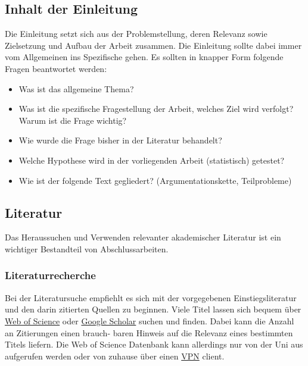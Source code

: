 \documentclass[a4paper,12pt]{article}
\providecommand{\tightlist}{%
  \setlength{\itemsep}{0pt}\setlength{\parskip}{0pt}}
\begin{document}
\hypertarget{inhalt-der-einleitung}{%
\subsection{Inhalt der Einleitung}\label{inhalt-der-einleitung}}

Die Einleitung setzt sich aus der Problemstellung, deren Relevanz sowie Zielsetzung und Aufbau der Arbeit zusammen. Die Einleitung sollte dabei immer vom Allgemeinen ins Spezifische gehen. Es sollten in knapper Form folgende Fragen beantwortet werden:
\begin{itemize}
\tightlist
\item
  Was ist das allgemeine Thema?
\item
  Was ist die spezifische Fragestellung der Arbeit, welches Ziel wird verfolgt? Warum ist die Frage wichtig?
\item
  Wie wurde die Frage bisher in der Literatur behandelt?
\item
  Welche Hypothese wird in der vorliegenden Arbeit (statistisch) getestet?
\item
  Wie ist der folgende Text gegliedert? (Argumentationskette, Teilprobleme)
\end{itemize}
\hypertarget{literatur}{%
\subsection{Literatur}\label{literatur}}

Das Heraussuchen und Verwenden relevanter akademischer Literatur ist ein wichtiger Bestandteil von Abschlussarbeiten.

\hypertarget{literaturrecherche}{%
\subsubsection{Literaturrecherche}\label{literaturrecherche}}

Bei der Literatursuche empfiehlt es sich mit der vorgegebenen Einstiegsliteratur und den darin zitierten Quellen zu beginnen. Viele Titel lassen sich bequem über \href{https://apps.webofknowledge.com/WOS_GeneralSearch_input.do?product=WOS\&search_mode=GeneralSearch\&SID=E4BQAzXmvUw7kPeUIBE\&preferencesSaved=}{Web of Science} oder \href{https://scholar.google.de/}{Google Scholar} suchen und finden. Dabei kann die Anzahl an Zitierungen einen brauch- baren Hinweis auf die Relevanz eines bestimmten Titels liefern. Die Web of Science Datenbank kann allerdings nur von der Uni aus aufgerufen werden oder von zuhause über einen \href{https://www.rrz.uni-hamburg.de/services/netz/vpn.html}{VPN} client.
\end{document}
